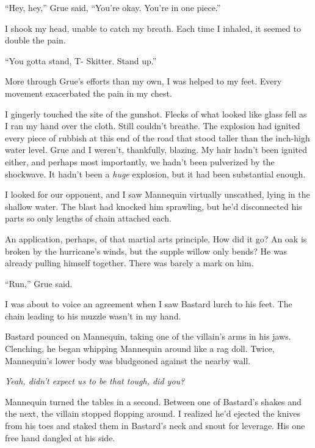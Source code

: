 ``Hey, hey,'' Grue said, ``You're okay.  You're in one piece.''



I shook my head, unable to catch my breath.  Each time I inhaled, it seemed to double the pain.



``You gotta stand, T-  Skitter.  Stand up.''



More through Grue's efforts than my own, I was helped to my feet.  Every movement exacerbated the pain in my chest.



I gingerly touched the site of the gunshot.  Flecks of what looked like glass fell as I ran my hand over the cloth.  Still couldn't breathe.  The explosion had ignited every piece of rubbish at this end of the road that stood taller than the inch-high water level.  Grue and I weren't, thankfully, blazing.  My hair hadn't been ignited either, and perhaps most importantly, we hadn't been pulverized by the shockwave.  It hadn't been a \emph{huge} explosion, but it had been substantial enough.



I looked for our opponent, and I saw Mannequin virtually unscathed, lying in the shallow water.  The blast had knocked him sprawling, but he'd disconnected his parts so only lengths of chain attached each.



An application, perhaps, of that martial arts principle.  How did it go?  An oak is broken by the hurricane's winds, but the supple willow only bends?  He was already pulling himself together.  There was barely a mark on him.



``Run,'' Grue said.



I was about to voice an agreement when I saw Bastard lurch to his feet.  The chain leading to his muzzle wasn't in my hand.



Bastard pounced on Mannequin, taking one of the villain's arms in his jaws.  Clenching, he began whipping Mannequin around like a rag doll.  Twice, Mannequin's lower body was bludgeoned against the nearby wall.



\emph{Yeah, didn't expect us to be that tough, did you?}



Mannequin turned the tables in a second.  Between one of Bastard's shakes and the next, the villain stopped flopping around.  I realized he'd ejected the knives from his toes and staked them in Bastard's neck and snout for leverage.  His one free hand dangled at his side.



